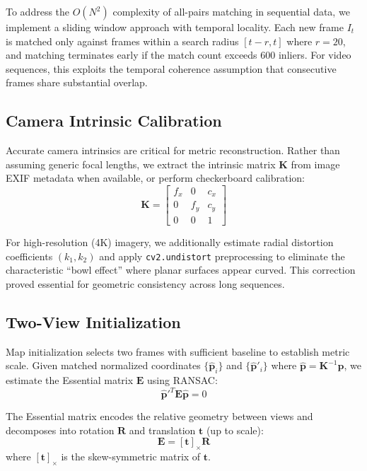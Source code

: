 \documentclass[10pt,twocolumn,letterpaper]{article}
\begin{document}
To address the $O(N^2)$ complexity of all-pairs matching in sequential data, we implement a sliding window approach with temporal locality. Each new frame $I_t$ is matched only against frames within a search radius $[t-r, t]$ where $r=20$, and matching terminates early if the match count exceeds 600 inliers. For video sequences, this exploits the temporal coherence assumption that consecutive frames share substantial overlap.

\subsection{Camera Intrinsic Calibration}

Accurate camera intrinsics are critical for metric reconstruction. Rather than assuming generic focal lengths, we extract the intrinsic matrix $\mathbf{K}$ from image EXIF metadata when available, or perform checkerboard calibration:
\begin{equation}
\mathbf{K} = \begin{bmatrix}
f_x & 0 & c_x \\
0 & f_y & c_y \\
0 & 0 & 1
\end{bmatrix}
\end{equation}

For high-resolution (4K) imagery, we additionally estimate radial distortion coefficients $(k_1, k_2)$ and apply \texttt{cv2.undistort} preprocessing to eliminate the characteristic ``bowl effect'' where planar surfaces appear curved. This correction proved essential for geometric consistency across long sequences.

\subsection{Two-View Initialization}

Map initialization selects two frames with sufficient baseline to establish metric scale. Given matched normalized coordinates $\{\hat{\mathbf{p}}_i\}$ and $\{\hat{\mathbf{p}}'_i\}$ where $\hat{\mathbf{p}} = \mathbf{K}^{-1}\mathbf{p}$, we estimate the Essential matrix $\mathbf{E}$ using RANSAC:
\begin{equation}
\hat{\mathbf{p}}'^T \mathbf{E} \hat{\mathbf{p}} = 0
\end{equation}

The Essential matrix encodes the relative geometry between views and decomposes into rotation $\mathbf{R}$ and translation $\mathbf{t}$ (up to scale):
\begin{equation}
\mathbf{E} = [\mathbf{t}]_\times \mathbf{R}
\end{equation}
where $[\mathbf{t}]_\times$ is the skew-symmetric matrix of $\mathbf{t}$.
\end{document}
